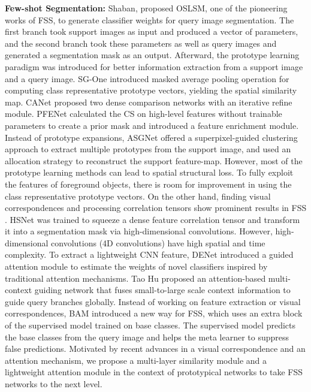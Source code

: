 \documentclass[10pt,twocolumn,letterpaper]{article}
\begin{document}
\textbf{Few-shot Segmentation:}
Shaban, \etal \cite{FSS1shaban} proposed OSLSM, one of the pioneering works of FSS, to generate classifier weights for query image segmentation. The first branch took support images as input and produced a vector of parameters, and the second branch took these parameters as well as query images and generated a segmentation mask as an output. Afterward, the prototype learning paradigm \cite{FSS17prototypical} was introduced for better information extraction from a support image and a query image. SG-One \cite{FSS19sg} introduced masked average pooling operation for computing class representative prototype vectors, yielding the spatial similarity map. CANet \cite{FSS21canet} proposed two dense comparison networks with an iterative refine module. PFENet \cite{FSS2PFE} calculated the CS on high-level features without trainable parameters to create a prior mask and introduced a feature enrichment module. Instead of prototype expansions, ASGNet \cite{FSS20asg} offered a superpixel-guided clustering approach to extract multiple prototypes from the support image, and used an allocation strategy to reconstruct the support feature-map. However, most of the prototype learning methods can lead to spatial structural loss. To fully exploit the features of foreground objects, there is room for improvement in using the class representative prototype vectors.
On the other hand, finding visual correspondences and processing correlation tensors show prominent results in FSS \cite{dense1,dense2,FSS9Hsnet}.
HSNet \cite{FSS9Hsnet} was trained to squeeze a dense feature correlation tensor and transform it into a segmentation mask via high-dimensional convolutions. However, high-dimensional convolutions (4D convolutions) have high spatial and time complexity. To extract a lightweight CNN feature, DENet \cite{denet} introduced a guided attention module to estimate the weights of novel classifiers inspired by traditional attention mechanisms. Tao Hu \etal \cite{tao} proposed an attention-based multi-context guiding network that fuses small-to-large scale context information to guide query branches globally. Instead of working on feature extraction or visual correspondences, BAM \cite{BAM} introduced a new way for FSS, which uses an extra block of the supervised model trained on base classes. The supervised model predicts the base classes from the query image and helps the meta learner to suppress false predictions. Motivated by recent advances in a visual correspondence and an attention mechanism, we propose a multi-layer similarity module and a lightweight attention module in the context of prototypical networks to take FSS networks to the next level.
\end{document}
